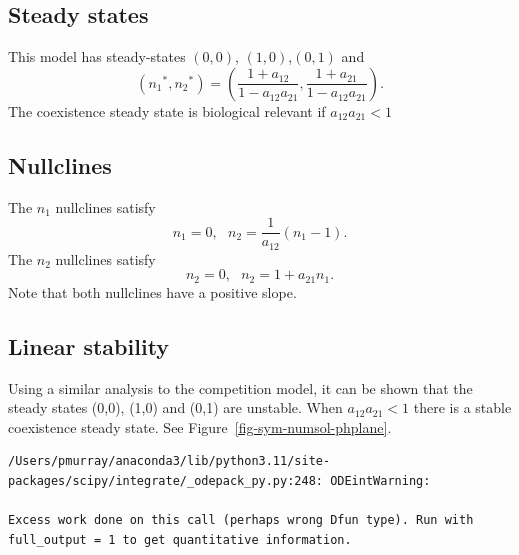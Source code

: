 \documentclass[
  letterpaper,
  DIV=11,
  numbers=noendperiod]{scrreprt}
\begin{document}
\hypertarget{steady-states-3}{%
\subsection{Steady states}\label{steady-states-3}}

This model has steady-states \((0,0)\), \((1,0)\),\((0,1)\) and\\
\[
\left({n_1}^*,{n_2}^*\right)=\left(\frac{1+a_{12}}{1-a_{12}a_{21}},\frac{1+a_{21}}{1-a_{12}a_{21}}\right).
\] The coexistence steady state is biological relevant if
\(a_{12}a_{21}<1\)

\hypertarget{nullclines-2}{%
\subsection{Nullclines}\label{nullclines-2}}

The \(n_1\) nullclines satisfy \[
n_1=0, \ \ \ n_2=\frac{1}{a_{12}}(n_1-1).
\] The \(n_2\) nullclines satisfy \[
n_2=0, \ \ \ n_2=1+a_{21}n_1.
\] Note that both nullclines have a positive slope.

\hypertarget{linear-stability-5}{%
\subsection{Linear stability}\label{linear-stability-5}}

Using a similar analysis to the competition model, it can be shown that
the steady states (0,0), (1,0) and (0,1) are unstable. When
\(a_{12}a_{21}<1\) there is a stable coexistence steady state. See
Figure~\ref{fig-sym-numsol-phplane}.

\begin{verbatim}
/Users/pmurray/anaconda3/lib/python3.11/site-packages/scipy/integrate/_odepack_py.py:248: ODEintWarning:

Excess work done on this call (perhaps wrong Dfun type). Run with full_output = 1 to get quantitative information.
\end{verbatim}
\end{document}
